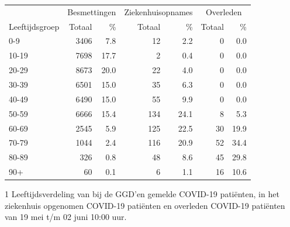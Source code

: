 \documentclass[
  english,
  man,floatsintext]{apa6}
\begin{document}
\begin{table}
\centering\begingroup\fontsize{11}{13}\selectfont

\begin{threeparttable}
\begin{tabular}{lrrrrrr}
\toprule
\multicolumn{1}{c}{ } & \multicolumn{2}{c}{Besmettingen} & \multicolumn{2}{c}{Ziekenhuisopnames} & \multicolumn{2}{c}{Overleden} \\
\cmidrule(l{3pt}r{3pt}){2-3} \cmidrule(l{3pt}r{3pt}){4-5} \cmidrule(l{3pt}r{3pt}){6-7}
Leeftijdsgroep & Totaal & \% & Totaal & \% & Totaal & \%\\
\midrule
0-9 & 3406 & 7.8 & 12 & 2.2 & 0 & 0.0\\
10-19 & 7698 & 17.7 & 2 & 0.4 & 0 & 0.0\\
20-29 & 8673 & 20.0 & 22 & 4.0 & 0 & 0.0\\
30-39 & 6501 & 15.0 & 35 & 6.3 & 0 & 0.0\\
40-49 & 6490 & 15.0 & 55 & 9.9 & 0 & 0.0\\
50-59 & 6666 & 15.4 & 134 & 24.1 & 8 & 5.3\\
60-69 & 2545 & 5.9 & 125 & 22.5 & 30 & 19.9\\
70-79 & 1044 & 2.4 & 116 & 20.9 & 52 & 34.4\\
80-89 & 326 & 0.8 & 48 & 8.6 & 45 & 29.8\\
90+ & 60 & 0.1 & 6 & 1.1 & 16 & 10.6\\
\bottomrule
\end{tabular}
\begin{tablenotes}
\item[1] Leeftijdsverdeling van bij de GGD’en gemelde COVID-19 patiënten, in het ziekenhuis opgenomen COVID-19 patiënten en overleden COVID-19 patiënten van 19 mei t/m 02 juni 10:00 uur.
\end{tablenotes}
\end{threeparttable}
\endgroup{}
\end{table}

\newpage
\end{document}
